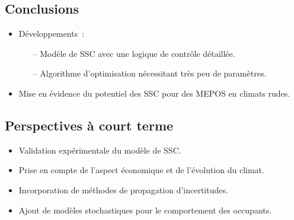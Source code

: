 \documentclass[xcolor=x11names, compress, 11pt]{beamer}
\begin{document}
\subsection{Conclusions}
\begin{frame}[c]
    \vfill
    \begin{itemize}
        \item Développements~:
        \begin{itemize}
            \item[--] Modèle de SSC avec une logique de contrôle détaillée.
            \item[--] Algorithme d’optimisation nécessitant très peu de paramètres.
        \end{itemize}
        \vfill
        \vfill
        \item<3-> Mise en évidence du potentiel des SSC pour des MEPOS en climats rudes.
    \end{itemize}
    \vfill
\end{frame}


\subsection{Perspectives à court terme}
\begin{frame}[c]
    \vfill
    \begin{itemize}
        \item Validation expérimentale du modèle de SSC.
    \vfill
        \item<2-> Prise en compte de l’aspect économique et de l’évolution du climat.
    \vfill
        \item<3-> Incorporation de méthodes de propagation d’incertitudes.
    \vfill
        \item<4-> Ajout de modèles stochastiques pour le comportement des occupants.
    \end{itemize}
    \vfill
\end{frame}
\end{document}
